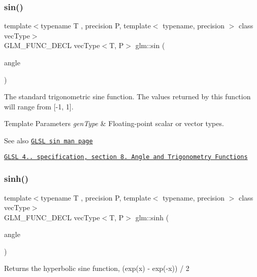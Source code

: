 \subsubsection{\texorpdfstring{sin()}{sin()}}
{\footnotesize\ttfamily template$<$typename T , precision P, template$<$ typename, precision $>$ class vec\+Type$>$ \\
G\+L\+M\+\_\+\+F\+U\+N\+C\+\_\+\+D\+E\+CL vec\+Type$<$T, P$>$ glm\+::sin (\begin{DoxyParamCaption}\item[{vec\+Type$<$ T, P $>$ const \&}]{angle }\end{DoxyParamCaption})}

The standard trigonometric sine function. The values returned by this function will range from \mbox{[}-\/1, 1\mbox{]}.


\begin{DoxyTemplParams}{Template Parameters}
{\em gen\+Type} & Floating-\/point scalar or vector types.\\
\hline
\end{DoxyTemplParams}
\begin{DoxySeeAlso}{See also}
\href{http://www.opengl.org/sdk/docs/manglsl/xhtml/sin.xml}{\tt G\+L\+SL sin man page} 

\href{http://www.opengl.org/registry/doc/GLSLangSpec.4.20.8.pdf}{\tt G\+L\+SL 4.. specification, section 8. Angle and Trigonometry Functions} 
\end{DoxySeeAlso}
\mbox{\label{group__core__func__trigonometric_gad8f89c12efe6f8d3ae8046625b266254}} 
\subsubsection{\texorpdfstring{sinh()}{sinh()}}
{\footnotesize\ttfamily template$<$typename T , precision P, template$<$ typename, precision $>$ class vec\+Type$>$ \\
G\+L\+M\+\_\+\+F\+U\+N\+C\+\_\+\+D\+E\+CL vec\+Type$<$T, P$>$ glm\+::sinh (\begin{DoxyParamCaption}\item[{vec\+Type$<$ T, P $>$ const \&}]{angle }\end{DoxyParamCaption})}

Returns the hyperbolic sine function, (exp(x) -\/ exp(-\/x)) / 2



